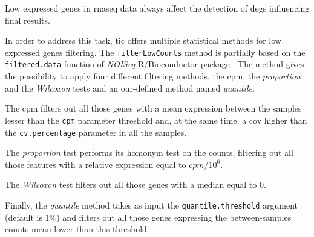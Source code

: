 Low expressed genes in \gls{rnaseq} data always affect the detection of \glspl{deg} \cite{Sha2015} influencing final results.

In order to address this task, \gls{tic} offers multiple statistical methods for low expressed genes filtering. 
The \lstinline!filterLowCounts! method is partially based on the \lstinline!filtered.data!  function of \textit{NOISeq} R/Bioconductor package \cite{Tarazona2011, Tarazona2015}. 
The method gives the possibility to apply four different filtering methods, the \gls{cpm}, the \textit{proportion} and the \textit{Wilcoxon} tests and an our-defined method named \textit{quantile}.

The \gls{cpm} filters out all those genes with a mean expression between the samples lesser than the \lstinline!cpm! parameter threshold and, at the same time, a \gls{cov} higher than the \lstinline!cv.percentage! parameter in all the samples.

The \textit{proportion} test performs its homonym test on the counts, filtering out all those features with a relative expression equal to $cpm/10^6$.

The \textit{Wilcoxon} test filters out all those genes with a median equal to $0$.

Finally, the \textit{quantile} method takes as input the \lstinline!quantile.threshold! argument (default is $1\%$) and filters out all those genes expressing the between-samples counts mean lower than this threshold.